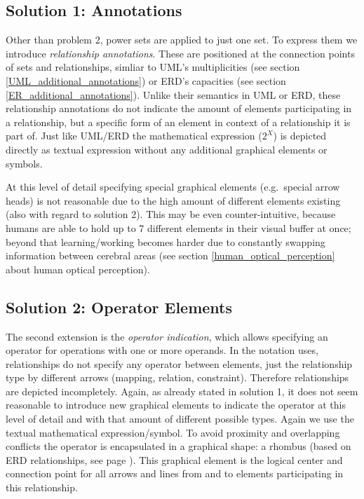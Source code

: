 \documentclass[twoside, openright, 12pt]{book}
\begin{document}
\subsection{Solution 1: Annotations}
Other than problem 2, power sets are applied to just one set.
To express them we introduce \textit{relationship annotations}.
These are positioned at the connection points of sets and relationships, simliar to UML's multiplicities (see section \ref{UML_additional_annotations}) or ERD's capacities (see section \ref{ER_additional_annotations}).
Unlike their semantics in UML or ERD, these relationship annotations do not indicate the amount of elements participating in a relationship, but a specific form of an element in context of a relationship it is part of.
Just like UML/ERD the mathematical expression ($2^X$) is depicted directly as textual expression without any additional graphical elements or symbols.

At this level of detail specifying special graphical elements (e.g.~special arrow heads) is not reasonable due to the high amount of different elements existing (also with regard to solution 2).
This may be even counter-intuitive, because humans are able to hold up to 7 different elements in their visual buffer at once; beyond that learning/working becomes harder due to constantly swapping information between cerebral areas (see section \ref{human_optical_perception} about human optical perception).



\subsection{Solution 2: Operator Elements}
The second extension is the \textit{operator indication}, which allows specifying an operator for operations with one or more operands.
In the notation \cite{Amthor18} uses, relationships do not specify any operator between elements, just the relationship type by different arrows (mapping, relation, constraint).
Therefore relationships are depicted incompletely.
Again, as already stated in solution 1, it does not seem reasonable to introduce new graphical elements to indicate the operator at this level of detail and with that amount of different possible types.
Again we use the textual mathematical expression/symbol.
To avoid proximity and overlapping conflicts the operator is encapsulated in a graphical shape: a rhombus (based on ERD relationships, see page \pageref{fig:ERD_relationship}).
This graphical element is the logical center and connection point for all arrows and lines from and to elements participating in this relationship.
\end{document}
